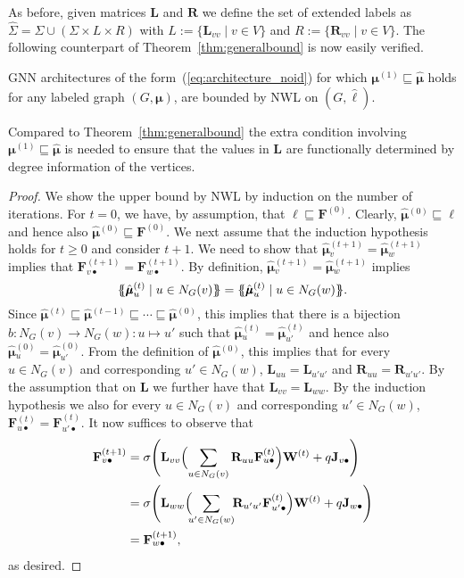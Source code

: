 As before, given matrices $\mathbf{L}$ and $\mathbf{R}$ we define the set of 
extended labels as $\hat{\Sigma}=\Sigma\cup (\Sigma\times L\times R)$ with
$L:=\{\mathbf{L}_{vv}\mid v\in V\}$ and $R:=\{\mathbf{R}_{vv}\mid v\in V\}$.
The following counterpart of Theorem~\ref{thm:generalbound} is now easily verified.

\begin{theorem}\label{thm:generalbound_noid}
GNN architectures of the form~(\ref{eq:architecture_noid}) for which 
$\pmb{\mu}^{(1)}\sqsubseteq \hat{\pmb{\mu}}$ holds for any labeled graph $(G,\pmb{\mu})$, are bounded by NWL on $(G,\hat{\pmb{\ell}})$.
\end{theorem}
Compared to Theorem~\ref{thm:generalbound} the extra condition involving $\pmb{\mu}^{(1)}\sqsubseteq \hat{\pmb{\mu}}$ is needed to ensure that the values in $\mathbf{L}$ are functionally determined by degree information of the vertices.

\begin{proof}
We show the upper bound by NWL by induction on the number of iterations. For $t=0$, we have, by assumption, that 
$\pmb{\ell}\sqsubseteq \mathbf{F}^{(0)}$. Clearly,
$\hat{\pmb{\mu}}{}^{(0)}\sqsubseteq \pmb{\ell}$ and hence also 
$\hat{\pmb{\mu}}{}^{(0)}\sqsubseteq\mathbf{F}^{(0)}$. We next assume that the induction hypothesis holds for $t\geq 0$ and consider $t+1$. We need to show that 
$\hat{\pmb{\mu}}{}^{(t+1)}_v=\hat{\pmb{\mu}}{}^{(t+1)}_w$ implies that $\mathbf{F}^{(t+1)}_{v\bullet}=\mathbf{F}^{(t+1)}_{w\bullet}$. By definition,
$\hat{\pmb{\mu}}{}^{(t+1)}_v=\hat{\pmb{\mu}}{}^{(t+1)}_w$ implies
$$
\ldbl \hat{\pmb{\mu}}{}^{(t)}_u \st u \in N_G(v) \rdbl=
 \ldbl \hat{\pmb{\mu}}{}^{(t)}_u \st u \in N_G(w) \rdbl.$$
 Since $\hat{\pmb{\mu}}{}^{(t)}\sqsubseteq \hat{\pmb{\mu}}{}^{(t-1)}\sqsubseteq \cdots\sqsubseteq \hat{\pmb{\mu}}{}^{(0)}$, this implies that  there is a bijection $b:N_G(v)\to N_G(w):u\mapsto u'$ such that $\hat{\pmb{\mu}}{}^{(t)}_u=\hat{\pmb{\mu}}{}^{(t)}_{u'}$ and hence also 
 $\hat{\pmb{\mu}}{}^{(0)}_u=\hat{\pmb{\mu}}{}^{(0)}_{u'}$.
From the definition of $\hat{\pmb{\mu}}{}^{(0)}$, this implies that for every $u\in N_G(v)$ and corresponding $u'\in N_G(w)$, $\mathbf{L}_{uu}=\mathbf{L}_{u'u'}$ and $\mathbf{R}_{uu}=\mathbf{R}_{u'u'}$. By the assumption that on $\mathbf{L}$ we further have that
$\mathbf{L}_{vv}=\mathbf{L}_{ww}$.
By the induction hypothesis we also for every $u\in N_G(v)$
   and corresponding $u'\in N_G(w)$, $\mathbf{F}^{(t)}_{u\bullet}=\mathbf{F}^{(t)}_{u'\bullet}$. It now suffices to observe that
  \begin{align*}
	  \mathbf{F}^{(t+1)}_{v\bullet}&=\sigma\Biggl(\mathbf{L}_{vv}\Bigl(\sum_{u\in N_G(v)} \mathbf{R}_{uu}\mathbf{F}^{(t)}_{u\bullet}\Bigr)\mathbf{W}^{(t)}+ q\mathbf{J}_{v\bullet}\Biggr)\\
	 & =\sigma\Biggl(\mathbf{L}_{ww}\Bigl(\!\!\sum_{u'\in N_G(w)}\!\! \mathbf{R}_{u'u'}\mathbf{F}^{(t)}_{u'\bullet}\Bigr)\mathbf{W}^{(t)}+ q\mathbf{J}_{w\bullet}\Biggr)\\
	  &=\mathbf{F}^{(t+1)}_{w\bullet},
\end{align*}
as desired.
\end{proof}


